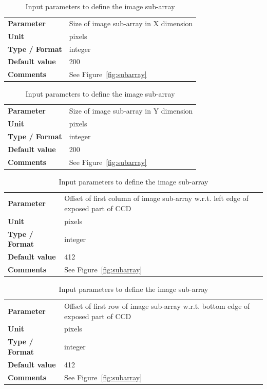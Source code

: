 \documentclass[11pt]{article}      %
\def\HCode#1{}
\def\htmlanchor#1{\HCode{<a id="#1"></a>}}
\begin{document}
\begin{table}[hb]
  \caption{Input parameters to define the image sub-array}

  \htmlanchor{subArrayXDim}
  \begin{tabular}{| l | p{13cm} |}
    \hline 
    {\bf Parameter} & Size of image sub-array in X dimension\\
    {\bf Unit} & pixels\\
    {\bf Type / Format} & integer\\
    {\bf Default value} & 200\\
    {\bf Comments} & See Figure~\ref{fig:subarray}\\
    \hline
  \end{tabular}
  \bigskip

  \htmlanchor{subArrayYDim}
  \begin{tabular}{| l | p{13cm} |}
    \hline 
    {\bf Parameter} & Size of image sub-array in Y dimension\\
    {\bf Unit} & pixels\\
    {\bf Type / Format} & integer\\
    {\bf Default value} & 200\\
    {\bf Comments} & See Figure~\ref{fig:subarray}\\
    \hline
  \end{tabular}
  \bigskip

  \htmlanchor{subArrayXOffset}
  \begin{tabular}{| l | p{13cm} |}
    \hline 
    {\bf Parameter} & Offset of first column of image sub-array w.r.t. left edge of exposed part of CCD\\
    {\bf Unit} & pixels\\
    {\bf Type / Format} & integer\\
    {\bf Default value} & 412\\
    {\bf Comments} & See Figure~\ref{fig:subarray}\\
    \hline
  \end{tabular}
  \bigskip

  \htmlanchor{subArrayYOffset}
  \begin{tabular}{| l | p{13cm} |}
    \hline 
    {\bf Parameter} & Offset of first row of image sub-array w.r.t. bottom edge of exposed part of CCD\\
    {\bf Unit} & pixels\\
    {\bf Type / Format} & integer\\
    {\bf Default value} & 412\\
    {\bf Comments} & See Figure~\ref{fig:subarray}\\
    \hline
  \end{tabular}
  \bigskip


\end{table}
\end{document}
